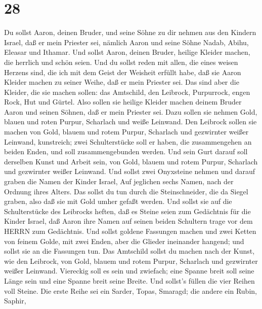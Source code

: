 \hypertarget{section-27}{%
\section{28}\label{section-27}}

 Du sollst Aaron, deinen Bruder, und seine Söhne zu dir
nehmen aus den Kindern Israel, daß er mein Priester sei, nämlich Aaron
und seine Söhne Nadab, Abihu, Eleasar und Ithamar.  Und
sollst Aaron, deinen Bruder, heilige Kleider machen, die herrlich und
schön seien.  Und du sollst reden mit allen, die eines
weisen Herzens sind, die ich mit dem Geist der Weisheit erfüllt habe,
daß sie Aaron Kleider machen zu seiner Weihe, daß er mein Priester sei.
 Das sind aber die Kleider, die sie machen sollen: das
Amtschild, den Leibrock, Purpurrock, engen Rock, Hut und Gürtel. Also
sollen sie heilige Kleider machen deinem Bruder Aaron und seinen Söhnen,
daß er mein Priester sei.  Dazu sollen sie nehmen Gold,
blauen und roten Purpur, Scharlach und weiße Leinwand.  Den
Leibrock sollen sie machen von Gold, blauem und rotem Purpur, Scharlach
und gezwirnter weißer Leinwand, kunstreich;  zwei
Schulterstücke soll er haben, die zusammengehen an beiden Enden, und
soll zusammengebunden werden.  Und sein Gurt darauf soll
derselben Kunst und Arbeit sein, von Gold, blauem und rotem Purpur,
Scharlach und gezwirnter weißer Leinwand.  Und sollst zwei
Onyxsteine nehmen und darauf graben die Namen der Kinder Israel,
 Auf jeglichen sechs Namen, nach der Ordnung ihres Alters.
 Das sollst du tun durch die Steinschneider, die da Siegel
graben, also daß sie mit Gold umher gefaßt werden.  Und
sollst sie auf die Schulterstücke des Leibrocks heften, daß es Steine
seien zum Gedächtnis für die Kinder Israel, daß Aaron ihre Namen auf
seinen beiden Schultern trage vor dem HERRN zum Gedächtnis.
 Und sollst goldene Fassungen machen  und zwei
Ketten von feinem Golde, mit zwei Enden, aber die Glieder ineinander
hangend; und sollst sie an die Fassungen tun.  Das
Amtschild sollst du machen nach der Kunst, wie den Leibrock, von Gold,
blauem und rotem Purpur, Scharlach und gezwirnter weißer Leinwand.
 Viereckig soll es sein und zwiefach; eine Spanne breit
soll seine Länge sein und eine Spanne breit seine Breite. 
Und sollst's füllen die vier Reihen voll Steine. Die erste Reihe sei ein
Sarder, Topas, Smaragd;  die andere ein Rubin, Saphir,
